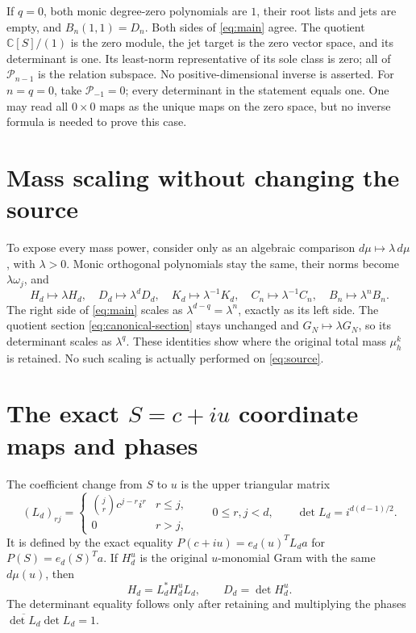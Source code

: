 \documentclass[11pt]{article}
\newcommand{\C}{\mathbb C}
\newcommand{\Pp}{\mathcal P}
\begin{document}
If \(q=0\), both monic degree-zero polynomials are \(1\), their root
lists and jets are empty, and \(B_n(1,1)=D_n\). Both sides of
\eqref{eq:main} agree. The quotient \(\C[S]/(1)\) is the zero module,
the jet target is the zero vector space, and its determinant is one.
Its least-norm representative of its sole class is zero; all of
\(\Pp_{n-1}\) is the relation subspace. No positive-dimensional inverse
is asserted. For \(n=q=0\), take \(\Pp_{-1}=0\); every determinant in
the statement equals one. One may read all \(0\times0\) maps as the
unique maps on the zero space, but no inverse formula is needed to prove
this case.

\section{Mass scaling without changing the source}\label{sec:mass}

To expose every mass power, consider only as an algebraic comparison
\(d\mu\mapsto\lambda\,d\mu\), with \(\lambda>0\). Monic
orthogonal polynomials stay the same, their norms become
\(\lambda\omega_j\), and
\[
 H_d\mapsto\lambda H_d,\quad D_d\mapsto\lambda^dD_d,
 \quad K_d\mapsto\lambda^{-1}K_d,\quad
 C_n\mapsto\lambda^{-1}C_n,\quad B_n\mapsto\lambda^nB_n.
\]
The right side of \eqref{eq:main} scales as
\(\lambda^{d-q}=\lambda^n\), exactly as its left side.
The quotient section \eqref{eq:canonical-section} stays unchanged and
\(G_N\mapsto\lambda G_N\), so its determinant scales as
\(\lambda^q\). These identities show where the original total mass
\(\mu_h^k\) is retained. No such scaling is actually performed on
\eqref{eq:source}.

\section{The exact \(S=c+iu\) coordinate maps and phases}\label{sec:phases}

The coefficient change from \(S\) to \(u\) is the upper triangular
matrix
\[
 (L_d)_{rj}=\begin{cases}\binom jr c^{j-r}i^r&r\leq j,\\0&r>j,
 \end{cases}
 \qquad 0\leq r,j<d,
 \qquad\det L_d=i^{d(d-1)/2}.
\]
It is defined by the exact equality
\(P(c+iu)=e_d(u)^TL_da\) for \(P(S)=e_d(S)^Ta\).
If \(H_d^{u}\) is the original \(u\)-monomial Gram with the same
\(d\mu(u)\), then
\begin{equation}\label{eq:coordinategram}
 H_d=L_d^*H_d^{u}L_d,\qquad D_d=\det H_d^{u}.
\end{equation}
The determinant equality follows only after retaining and multiplying
the phases \(\overline{\det L_d}\det L_d=1\).
\end{document}
